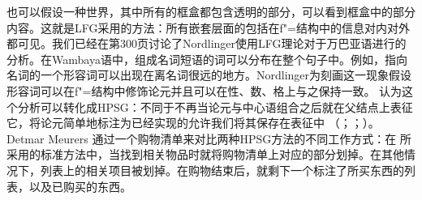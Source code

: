 也\label{page-Bender-Wambaya-two}可以假设一种世界，其中所有的框盒都包含透明的部分，可以看到框盒中的部分内容。这就是LFG\indexlfgc 采用的方法：所有嵌套层面的包括在f"=结构中的信息对内对外都可见。我们已经在第300页讨论了Nordlinger\citeyearpar{Nordlinger98a-u}使用LFG理论对于万巴亚语进行的分析。在Wambaya语中，组成名词短语的词可以分布在整个句子中。例如，指向名词的一个形容词可以出现在离名词很远的地方。Nordlinger为刻画这一现象假设形容词可以在f"=结构中修饰论元并且可以在性、数、格上与之保持一致。 \citet{Bender2008a}认为这个分析可以转化成HPSG\indexhpsgc：不同于不再当论元与中心语组合之后就在父结点上表征它，将论元简单地标注为已经实现的允许我们将其保存在表征中 （\citealp{Meurers99b}；\citealp{Prze99}；\citealp[\S~17.4]{MuellerLehrbuch1}）。Detmar Meurers 通过一个购物清单来对比两种HPSG方法的不同工作方式：在 \citet{ps2}所采用的标准方法中，当找到相关物品时就将购物清单上对应的部分划掉。在其他情况下，列表上的相关项目被划掉。在购物结束后，就剩下一个标注了所买东西的列表，以及已购买的东西。
  
